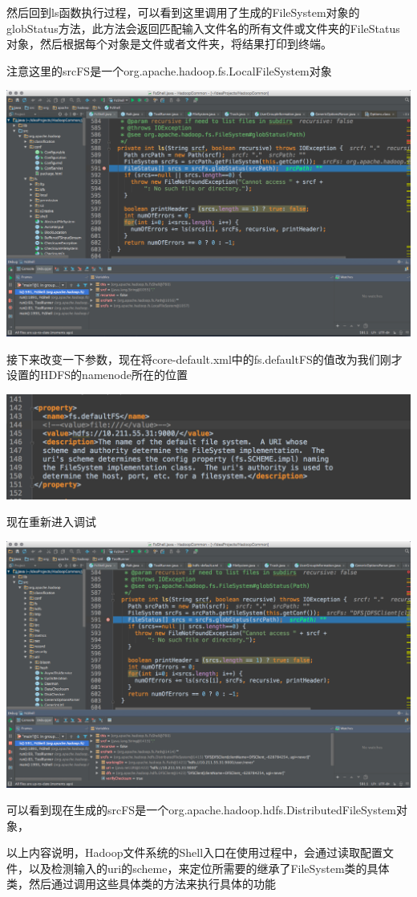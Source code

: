 然后回到ls函数执行过程，可以看到这里调用了生成的FileSystem对象的globStatus方法，此方法会返回匹配输入文件名的所有文件或文件夹的FileStatus对象，然后根据每个对象是文件或者文件夹，将结果打印到终端。

注意这里的srcFS是一个org.apache.hadoop.fs.LocalFileSystem对象

\includegraphics[width=\textwidth]{image/env/cr40.png}

接下来改变一下参数，现在将core-default.xml中的fs.defaultFS的值改为我们刚才设置的HDFS的namenode所在的位置

\includegraphics[width=\textwidth]{image/env/cr41.png}

现在重新进入调试

\includegraphics[width=\textwidth]{image/env/cr42.png}

可以看到现在生成的srcFS是一个org.apache.hadoop.hdfs.DistributedFileSystem对象，


以上内容说明，Hadoop文件系统的Shell入口在使用过程中，会通过读取配置文件，以及检测输入的uri的scheme，来定位所需要的继承了FileSystem类的具体类，然后通过调用这些具体类的方法来执行具体的功能
